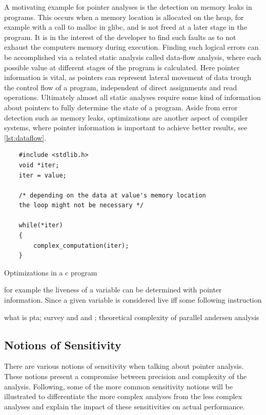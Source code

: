 A motivating example for pointer analyses is the detection on memory leaks in programs.
This occurs when a memory location is allocated on the heap, for example with a call to malloc in glibc, and is not freed at a later stage in the program.
It is in the interest of the developer to find such faults as to not exhaust the computers memory during execution.
Finding such logical errors can be accomplished via a related static analysis called data-flow analysis, where each possible value at different stages of the program is calculated. Here pointer information is vital, as pointers can represent lateral movement of data trough the control flow of a program, independent of direct assignments and read operations. Ultimately almost all static analyses require some kind of information about pointers to fully determine the state of a program.
Aside from error detection such as memory leaks, optimizations are another aspect of compiler systems, where pointer information is important to achieve better results, see \autoref{lst:dataflow}.

\begin{listing}
    \begin{verbatim}
    #include <stdlib.h>
    void *iter;
    iter = value;

    /* depending on the data at value's memory location 
    the loop might not be necessary */
    
    while(*iter)
    {
        complex_computation(iter);
    }
    \end{verbatim}
    \caption{Optimizations in a c program}
    \label{lst:dataflow}
\end{listing}

for example the liveness of a variable can be determined with pointer information. Since a given variable is considered live iff some following instruction

what is pta; survey \autocite{hind2001pointer} and \autocite{toman2017taming} and \autocite{smaragdakis2015pointer}; theoretical complexity of parallel andersen analysis \autocite{mathiasen2021fine}

\subsection{Notions of Sensitivity}
There are various notions of sensitivity when talking about pointer analysis.
These notions present a compromise between precision and complexity of the analysis.
Following, some of the more common sensitivity notions will be illustrated to differentiate the more complex analyses from the less complex analyses and explain the impact of these sensitivities on actual performance.

